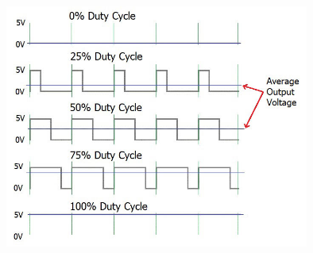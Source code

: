 \documentclass[12pt,a4paper]{article}
\begin{document}
\begin{figure}[h!]
\centering
\includegraphics[width=10cm]{Pulse-Width-Modulation.jpg} 
\end{figure}
\end{document}
